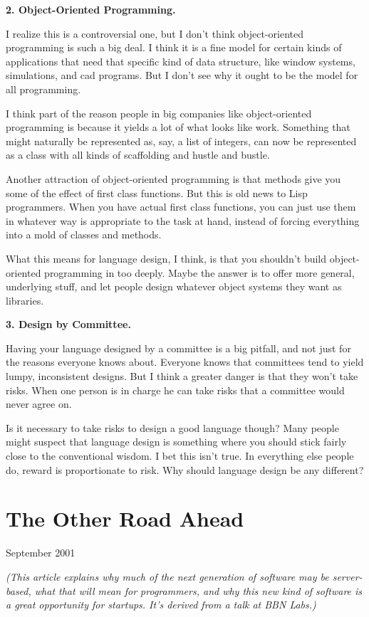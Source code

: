 \documentclass[12pt]{book}
\begin{document}
\textbf{2. Object-Oriented Programming.}

I realize this is a controversial one, but I don't think object-oriented
programming is such a big deal. I think it is a fine model for certain
kinds of applications that need that specific kind of data structure,
like window systems, simulations, and cad programs. But I don't see why
it ought to be the model for all programming.

I think part of the reason people in big companies like object-oriented
programming is because it yields a lot of what looks like work.
Something that might naturally be represented as, say, a list of
integers, can now be represented as a class with all kinds of
scaffolding and hustle and bustle.

Another attraction of object-oriented programming is that methods give
you some of the effect of first class functions. But this is old news to
Lisp programmers. When you have actual first class functions, you can
just use them in whatever way is appropriate to the task at hand,
instead of forcing everything into a mold of classes and methods.

What this means for language design, I think, is that you shouldn't
build object-oriented programming in too deeply. Maybe the answer is to
offer more general, underlying stuff, and let people design whatever
object systems they want as libraries.

\textbf{3. Design by Committee.}

Having your language designed by a committee is a big pitfall, and not
just for the reasons everyone knows about. Everyone knows that
committees tend to yield lumpy, inconsistent designs. But I think a
greater danger is that they won't take risks. When one person is in
charge he can take risks that a committee would never agree on.

Is it necessary to take risks to design a good language though? Many
people might suspect that language design is something where you should
stick fairly close to the conventional wisdom. I bet this isn't true. In
everything else people do, reward is proportionate to risk. Why should
language design be any different?
\chapter{The Other Road Ahead}

September 2001

\emph{(This article explains why much of the next generation of software
may be server-based, what that will mean for programmers, and why this
new kind of software is a great opportunity for startups. It's derived
from a talk at BBN Labs.)}
\end{document}
